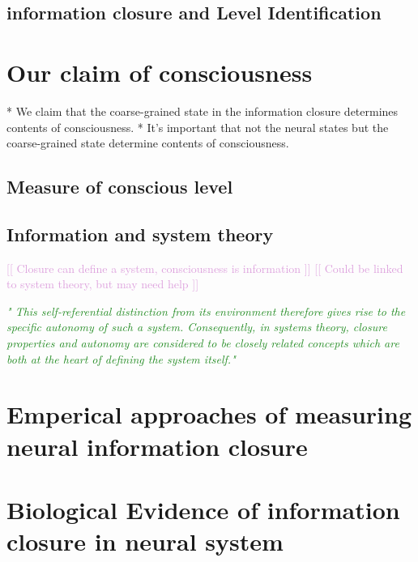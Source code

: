 \documentclass[utf8]{article}
\newcommand{\rewrite}[1]{\textcolor{ForestGreen}{\textit{"#1"}}}
\newcommand{\temp}[1]{\textcolor{Plum}{[[ #1 ]]\newline}}
\begin{document}
		\subsection{information closure and Level Identification}	
		
	\section{Our claim of consciousness}
		* We claim that the coarse-grained state in the information closure determines contents of 
		consciousness. 
		* It's important that not the neural states but the coarse-grained state determine contents
		of consciousness. 
		   
		
		\subsection{Measure of conscious level}


		\subsection{Information and system theory}
			\temp{Closure can define a system, consciousness is information}
			\temp{Could be linked to system theory, but may need help}
		
			\rewrite{
				This self-referential distinction from its environment therefore gives rise to the specific autonomy of such a system. Consequently, in systems theory, closure properties and autonomy are considered to be closely related concepts which are both at the heart of defining the system itself.}
	\section{Emperical approaches of measuring neural information closure}
		
		
	\section{Biological Evidence of information closure in neural system}
		
		
		
\end{document}

